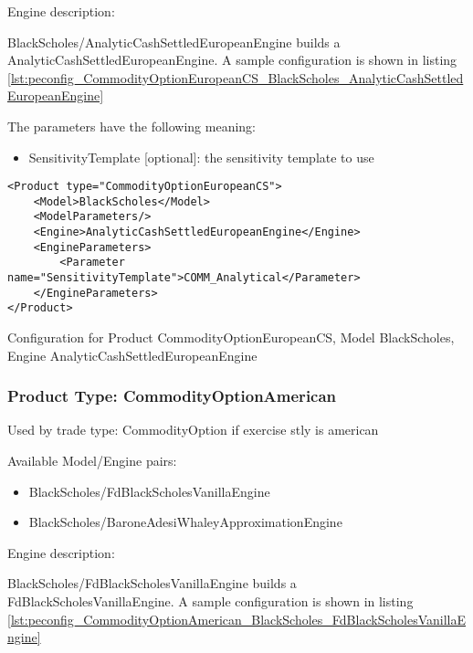 Engine description:

BlackScholes/AnalyticCashSettledEuropeanEngine builds a AnalyticCashSettledEuropeanEngine. A sample configuration is shown in listing
\ref{lst:peconfig_CommodityOptionEuropeanCS_BlackScholes_AnalyticCashSettledEuropeanEngine}

The parameters have the following meaning:

\begin{itemize}
\item SensitivityTemplate [optional]: the sensitivity template to use 
\end{itemize}

\begin{longlisting}
\begin{verbatim}
<Product type="CommodityOptionEuropeanCS">
    <Model>BlackScholes</Model>
    <ModelParameters/>
    <Engine>AnalyticCashSettledEuropeanEngine</Engine>
    <EngineParameters>
        <Parameter name="SensitivityTemplate">COMM_Analytical</Parameter>
    </EngineParameters>
</Product>
\end{verbatim}
\caption{Configuration for Product CommodityOptionEuropeanCS, Model BlackScholes, Engine AnalyticCashSettledEuropeanEngine}
\label{lst:peconfig_CommodityOptionEuropeanCS_BlackScholes_AnalyticCashSettledEuropeanEngine}
\end{longlisting}

\subsubsection{Product Type: CommodityOptionAmerican}

Used by trade type: CommodityOption if exercise stly is american

Available Model/Engine pairs:

\begin{itemize}
\item BlackScholes/FdBlackScholesVanillaEngine
\item BlackScholes/BaroneAdesiWhaleyApproximationEngine
\end{itemize}

Engine description:

BlackScholes/FdBlackScholesVanillaEngine builds a FdBlackScholesVanillaEngine. A sample configuration is shown in listing
\ref{lst:peconfig_CommodityOptionAmerican_BlackScholes_FdBlackScholesVanillaEngine}

